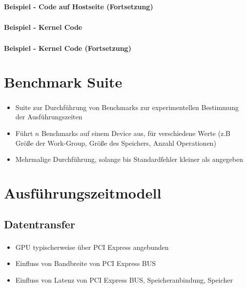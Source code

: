 \documentclass{beamer}
\begin{document}
\begin{frame}
	\frametitle{}
	\framesubtitle{Beispiel - Code auf Hostseite (Fortsetzung)}
	
\end{frame}

\begin{frame}
	\frametitle{}
	\framesubtitle{Beispiel - Kernel Code}
	
\end{frame}

\begin{frame}
	\frametitle{}
	\framesubtitle{Beispiel - Kernel Code (Fortsetzung)}
	
\end{frame}

\section{Benchmark Suite}
\label{sect:suite}

\begin{frame}
	\frametitle{}
	\begin{itemize}
		\item Suite zur Durchführung von Benchmarks zur experimentellen Bestimmung der Ausführungszeiten
		\item Führt $n$ Benchmarks auf einem Device aus, für verschiedene Werte (z.B Größe der Work-Group, Größe des Speichers, Anzahl Operationen)
		\item Mehrmalige Durchführung, solange bis Standardfehler kleiner als angegeben
	\end{itemize}
\end{frame}

\section{Ausführungszeitmodell}
\label{sect:model}

\subsection{Datentransfer}
\label{sect:model_transfer}

\begin{frame}
	\frametitle{}
	\framesubtitle{}
	\begin{itemize}
		\item GPU typischerweise über PCI Express angebunden
		\item Einfluss von Bandbreite von PCI Express BUS
		\item Einfluss von Latenz von PCI Express BUS, Speicheranbindung, Speicher
	\end{itemize}
\end{frame}
\end{document}
